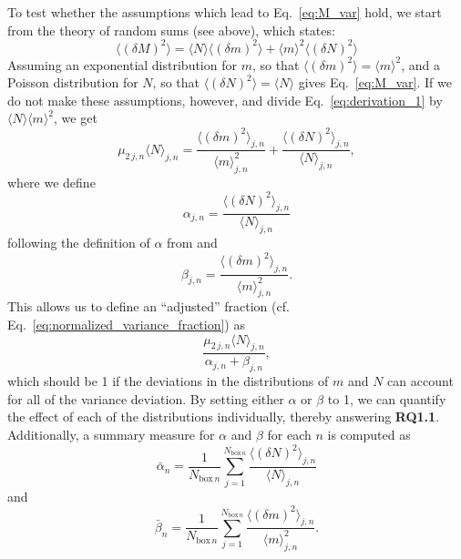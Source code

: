 \documentclass[a4paper, 12pt]{article}
\begin{document}
To test whether the assumptions which lead to Eq.~\ref{eq:M_var} hold, we start from the theory of random sums (see above), which states:
\begin{equation} \label{eq:derivation_1}
 \langle (\delta M)^2 \rangle = \langle N \rangle \langle (\delta m)^2 \rangle + \langle m \rangle^2 \langle (\delta N)^2 \rangle
\end{equation}
Assuming an exponential distribution for $m$, so that $\langle (\delta m)^2 \rangle = \langle m \rangle^2$, and a Poisson distribution for $N$, so that $\langle (\delta 
N)^2 \rangle = \langle N \rangle$ gives Eq.~\ref{eq:M_var}. If we do not make these assumptions, however, and divide Eq.~\ref{eq:derivation_1} by $\langle N \rangle \langle m \rangle^2$, we get
\begin{equation} \label{eq:derivation_2}
 \mu_{2\,j,n} \langle N \rangle_{j,n} = \frac{\langle (\delta m)^2 \rangle_{j,n}}{\langle m \rangle_{j,n}^2} + \frac{\langle (\delta N)^2 \rangle_{j,n}}{\langle N \rangle_{j,n}},
\end{equation}
where we define 
\begin{equation} \label{eq:alpha}
 \alpha_{j,n} = \frac{\langle (\delta N)^2 \rangle_{j,n}}{\langle N \rangle_{j,n}}
\end{equation}
following the definition of $\alpha$ from \cite{Davoudi2010} and 
\begin{equation} \label{eq:beta}
 \beta_{j,n} = \frac{\langle (\delta m)^2 \rangle_{j,n}}{\langle m \rangle_{j,n}^2}.
\end{equation}
This allows us to define an ``adjusted'' fraction (cf. Eq.~\ref{eq:normalized_variance_fraction}) as
\begin{equation} \label{eq:adjusted_variance_fraction}
 \frac{\mu_{2\,j, n} \langle N \rangle_{j,n} }{\alpha_{j,n} + \beta_{j,n}},
\end{equation}
which should be 1 if the deviations in the distributions of $m$ and $N$ can account for all of the variance deviation. By setting either $\alpha$ or $\beta$ to 1, we can quantify the effect of each of the distributions individually, thereby answering \textbf{RQ1.1}. Additionally, a summary measure for $\alpha$ and $\beta$ for each $n$ is computed as
\begin{equation} \label{eq:mean_alpha}
 \bar{\alpha}_n = \frac{1}{N_{\mathrm{box}\,n}} \sum_{j=1}^{N_{\mathrm{box}\,n}} \frac{\langle (\delta N)^2 \rangle_{j,n}}{\langle N \rangle_{j,n}}
\end{equation}
and
\begin{equation} \label{eq:mean_beta}
  \bar{\beta}_n = \frac{1}{N_{\mathrm{box}\,n}} \sum_{j=1}^{N_{\mathrm{box}\,n}} \frac{\langle (\delta m)^2 \rangle_{j,n}}{\langle m \rangle_{j,n}^2}.
\end{equation}
\end{document}
